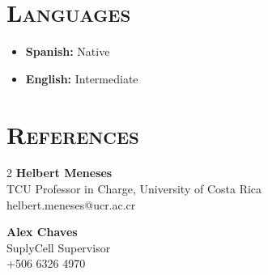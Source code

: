 \documentclass[a4paper,9pt]{article}
\begin{document}
\section*{\textsc{Languages}}
\small
\begin{itemize}
    \item \textbf{Spanish:} Native
    \item \textbf{English:} Intermediate
\end{itemize}

\section*{\textsc{References}}
\small
\begin{multicols}{2}
\textbf{Helbert Meneses} \\
TCU Professor in Charge, University of Costa Rica \\
helbert.meneses@ucr.ac.cr

\columnbreak

\textbf{Alex Chaves} \\
SuplyCell Supervisor \\
+506 6326 4970
\end{multicols}
\end{document}
